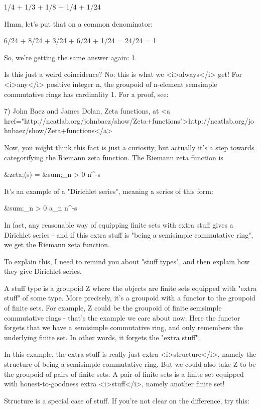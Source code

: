 1/4 + 1/3 +  1/8 + 1/4 + 1/24

Hmm, let's put that on a common denominator:

6/24 + 8/24 + 3/24 + 6/24 + 1/24 = 24/24 = 1

So, we're getting the same answer again: 1.

Is this just a weird coincidence?  No: this is what we <i>always</i> get!  For <i>any</i> positive integer n, the groupoid of n-element semsimple commutative rings has cardinality 1.  For a proof, see:

7) John Baez and James Dolan, Zeta functions, at <a
href="http://ncatlab.org/johnbaez/show/Zeta+functions">http://ncatlab.org/johnbaez/show/Zeta+functions</a>

Now, you might think this fact is just a curiosity, but actually it's
a step towards categorifying the Riemann zeta function.  The Riemann
zeta function is

&zeta;(s) = &sum;_{n > 0} n^{-s}

It's an example of a "Dirichlet series", meaning a series of this form:

&sum;_{n > 0} a_{n} n^{-s}

In fact, any reasonable way of equipping finite sets with extra stuff
gives a Dirichlet series - and if this extra stuff is "being a
semisimple commutative ring", we get the Riemann zeta function.

To explain this, I need to remind you about "stuff types", and then
explain how they give Dirichlet series.

A stuff type is a groupoid Z where the objects are finite sets
equipped with "extra stuff" of some type.  More precisely, it's a
groupoid with a functor to the groupoid of finite sets.  For example,
Z could be the groupoid of finite semsimple commutative rings - that's
the example we care about now.  Here the functor forgets that we have
a semisimple commutative ring, and only remembers the underlying
finite set.  In other words, it forgets the "extra stuff".

In this example, the extra stuff is really just extra
<i>structure</i>, namely the structure of being a semisimple
commutative ring.  But we could also take Z to be the groupoid of
pairs of finite sets.  A pair of finite sets is a finite set equipped
with honest-to-goodness extra <i>stuff</i>, namely another finite set!

Structure is a special case of stuff.  If you're not clear on the
difference, try this:


